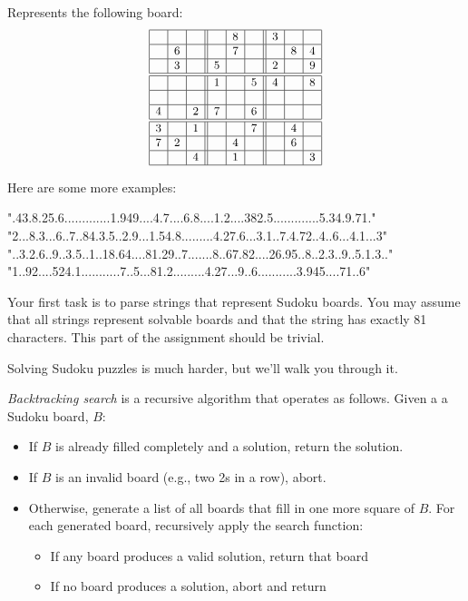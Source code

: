 \documentclass[9pt]{extbook}
\begin{document}
Represents the following board:
\[
\small
\begin{array}{|c|c|c||c|c|c||c|c|c|}
\hline
  &   &   &   & 8 &   & 3 &    & \\
\hline
  & 6 &   &   & 7 &   &   & 8 & 4 \\
\hline
  & 3 &   & 5 &   &   & 2 &   & 9 \\
\hline \hline
  &   &   & 1 &   & 5 & 4 &   & 8 \\
\hline
  &   &   &   &   &   &   &   &   \\
\hline
4 &   & 2 & 7 &   & 6 &   &   &   \\
\hline \hline
3 &   & 1 &   &   & 7 &   & 4 &   \\
\hline
7 & 2 &   &   & 4 &   &   & 6 &   \\
\hline
  &   & 4 &   & 1 &   &   &   & 3 \\
\hline
\end{array}
\]

Here are some more examples:

\begin{scalacode}
".43.8.25.6.............1.949....4.7....6.8....1.2....382.5.............5.34.9.71."
"2...8.3...6..7..84.3.5..2.9...1.54.8.........4.27.6...3.1..7.4.72..4..6...4.1...3"
"..3.2.6..9..3.5..1..18.64....81.29..7.......8..67.82....26.95..8..2.3..9..5.1.3.."
"1..92....524.1...........7..5...81.2.........4.27...9..6...........3.945....71..6"
\end{scalacode}

Your first task is to parse strings that represent Sudoku boards. You may
assume that all strings represent solvable boards and that the string has
exactly 81 characters. This part of the assignment should be trivial.

Solving Sudoku puzzles is much harder, but we'll walk you through it.

\emph{Backtracking search} is a recursive algorithm that operates as
follows. Given a a Sudoku board, $B$:

\begin{itemize}
\item If $B$ is already filled completely and a solution, return the solution.
\item If $B$ is an invalid board (e.g., two 2s in a row), abort.
\item Otherwise, generate a list of all boards that fill in one more square of
  $B$. For each generated board, recursively apply the search function:
  \begin{itemize}
  \item If any board produces a valid solution, return that board
  \item If no board produces a solution, abort and return
  \end{itemize}
\end{itemize}
\end{document}
